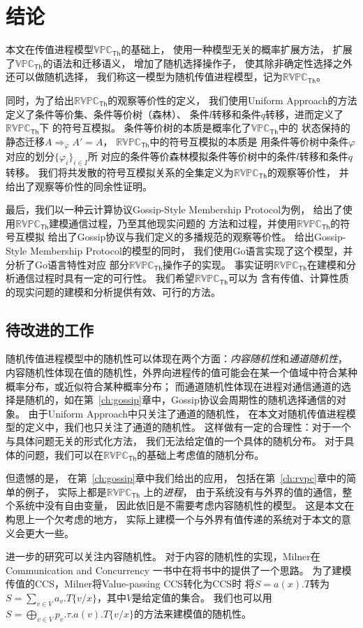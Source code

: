 \chapter{结论}

本文在传值进程模型$\mathbb{VPC}_{\mathsf{Th}}$的基础上，
使用一种模型无关的概率扩展方法，
扩展了$\mathbb{VPC}_{\mathsf{Th}}$的语法和迁移语义，
增加了随机选择操作子，
使其除非确定性选择之外还可以做随机选择，
我们称这一模型为随机传值进程模型，记为$\mathbb{RVPC}_{\mathsf{Th}}$。

同时，为了给出$\mathbb{RVPC}_{\mathsf{Th}}$的观察等价性的定义，
我们使用Uniform Approach的方法定义了条件等价集、条件等价树（森林）、
条件$l$转移和条件$q$转移，进而定义了$\mathbb{RVPC}_{\mathsf{Th}}$下
的符号互模拟。
条件等价树的本质是概率化了$\mathbb{VPC}_{\mathsf{Th}}$中的
状态保持的静态迁移$A\Rightarrow_{\varphi}A'=A$，
$\mathbb{RVPC}_{\mathsf{Th}}$中的符号互模拟的本质是
用条件等价树中条件$\varphi$对应的划分$\{\varphi_i\}_{i\in I}$所
对应的条件等价森林模拟条件等价树中的条件$l$转移和条件$q$转移。
我们将共发散的符号互模拟关系的全集定义为$\mathbb{RVPC}_{\mathsf{Th}}$的观察等价性，
并给出了观察等价性的同余性证明。

最后，我们以一种云计算协议Gossip-Style Membership Protocol为例，
给出了使用$\mathbb{RVPC}_{\mathsf{Th}}$建模通信过程，乃至其他现实问题的
方法和过程，并使用$\mathbb{RVPC}_{\mathsf{Th}}$的符号互模拟
给出了Gossip协议与我们定义的多播规范的观察等价性。
给出Gossip-Style Membership Protocol的模型的同时，
我们使用Go语言实现了这个模型，并分析了Go语言特性对应
部分$\mathbb{RVPC}_{\mathsf{Th}}$操作子的实现。
事实证明$\mathbb{RVPC}_{\mathsf{Th}}$在建模和分析通信过程时具有一定的可行性。
我们希望$\mathbb{RVPC}_{\mathsf{Th}}$可以为
含有传值、计算性质的现实问题的建模和分析提供有效、可行的方法。

\section{待改进的工作}
随机传值进程模型中的随机性可以体现在两个方面：\textit{内容随机性}和\textit{通道随机性}，
内容随机性体现在值的随机性，外界向进程传的值可能会在某一个值域中符合某种概率分布，或近似符合某种概率分布；
而通道随机性体现在进程对通信通道的选择是随机的，如在第~\ref{ch:gossip}章中，Gossip协议会周期性的随机选择通信的对象。
由于Uniform Approach中只关注了通道的随机性，
在本文对随机传值进程模型的定义中，我们也只关注了通道的随机性。
这样做有一定的合理性：对于一个与具体问题无关的形式化方法，
我们无法给定值的一个具体的随机分布。
对于具体的问题，我们可以在$\mathbb{RVPC}_{\mathsf{Th}}$的基础上考虑值的随机分布。

但遗憾的是，
在第~\ref{ch:gossip}章中我们给出的应用，
包括在第~\ref{ch:rvpc}章中的简单的例子，
实际上都是$\mathbb{RVPC}_{\mathsf{Th}}$
上的\textit{进程}，
由于系统没有与外界的值的通信，整个系统中没有自由变量，
因此依旧是不需要考虑内容随机性的模型。
这是本文在构思上一个欠考虑的地方，
实际上建模一个与外界有值传递的系统对于本文的意义会更大一些。

进一步的研究可以关注内容随机性。
对于内容的随机性的实现，Milner在Communication and Concurrency
一书中在将书中的提供了一个思路。
为了建模传值的CCS，Milner将Value-passing CCS转化为CCS时
将$S=a(x).T$转为$S=\sum_{v\in V} a_v.T\{v/x\}$，其中$V$是给定值的集合。
我们也可以用$S=\bigoplus_{v\in V}p_v.\tau.a(v).T\{v/x\}$的方法来建模值的随机性。